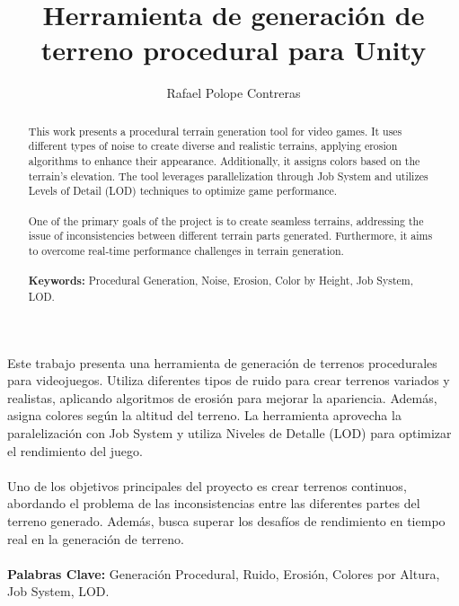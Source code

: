 \documentclass[book,spanish,a4paper,12pt]{tfg}
\title{Herramienta de generación de terreno procedural para Unity}
\author{Rafael Polope Contreras}
\begin{document}
\portada
\cleardoublepage


\begin{resumen}
  Este trabajo presenta una herramienta de generación de terrenos procedurales para videojuegos. Utiliza diferentes tipos de ruido para crear terrenos variados y realistas, aplicando algoritmos de erosión para mejorar la apariencia. Además, asigna colores según la altitud del terreno. La herramienta aprovecha la paralelización con Job System y utiliza Niveles de Detalle (LOD) para optimizar el rendimiento del juego.\\
  \\
  Uno de los objetivos principales del proyecto es crear terrenos continuos, abordando el problema de las inconsistencias entre las diferentes partes del terreno generado. Además, busca superar los desafíos de rendimiento en tiempo real en la generación de terreno.\\
  \\
  \textbf{Palabras Clave:} Generación Procedural, Ruido, Erosión, Colores por Altura, Job System, LOD.
\end{resumen}

\cleardoublepage

\begin{abstract}
  This work presents a procedural terrain generation tool for video games. It uses different types of noise to create diverse and realistic terrains, applying erosion algorithms to enhance their appearance. Additionally, it assigns colors based on the terrain's elevation. The tool leverages parallelization through Job System and utilizes Levels of Detail (LOD) techniques to optimize game performance.\\
  \\
  One of the primary goals of the project is to create seamless terrains, addressing the issue of inconsistencies between different terrain parts generated. Furthermore, it aims to overcome real-time performance challenges in terrain generation.\\
  \\
  \textbf{Keywords:} Procedural Generation, Noise, Erosion, Color by Height, Job System, LOD.
\end{abstract}

\cleardoublepage
\end{document}
